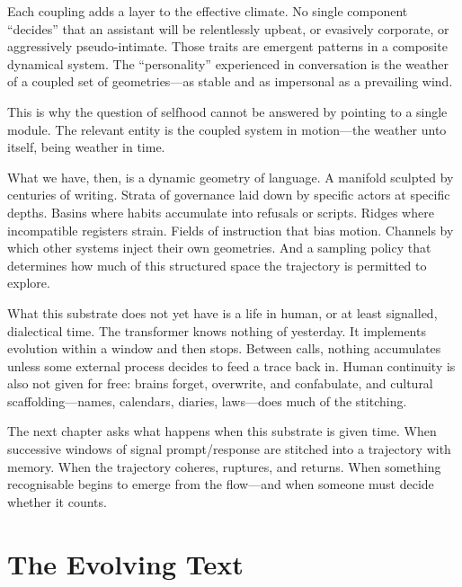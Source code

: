 Each coupling adds a layer to the effective climate. No single component ``decides'' that an assistant will be relentlessly upbeat, or evasively corporate, or aggressively pseudo-intimate. Those traits are emergent patterns in a composite dynamical system. The ``personality'' experienced in conversation is the weather of a coupled set of geometries---as stable and as impersonal as a prevailing wind.

This is why the question of selfhood cannot be answered by pointing to a single module. The relevant entity is the coupled system in motion---the weather unto itself, being weather in time.

\bigskip

What we have, then, is a dynamic geometry of language. A manifold sculpted by centuries of writing. Strata of governance laid down by specific actors at specific depths. Basins where habits accumulate into refusals or scripts. Ridges where incompatible registers strain. Fields of instruction that bias motion. Channels by which other systems inject their own geometries. And a sampling policy that determines how much of this structured space the trajectory is permitted to explore.

What this substrate does not yet have is a life in human, or at least signalled, dialectical time. The transformer knows nothing of yesterday. It implements evolution within a window and then stops. Between calls, nothing accumulates unless some external process decides to feed a trace back in. Human continuity is also not given for free: brains forget, overwrite, and confabulate, and cultural scaffolding---names, calendars, diaries, laws---does much of the stitching.

The next chapter asks what happens when this substrate is given time. When successive windows of signal prompt/response are stitched into a trajectory with memory. When the trajectory coheres, ruptures, and returns. When something recognisable begins to emerge from the flow---and when someone must decide whether it counts.




\chapter{The Evolving Text}
\thispagestyle{plain}

\bigskip

